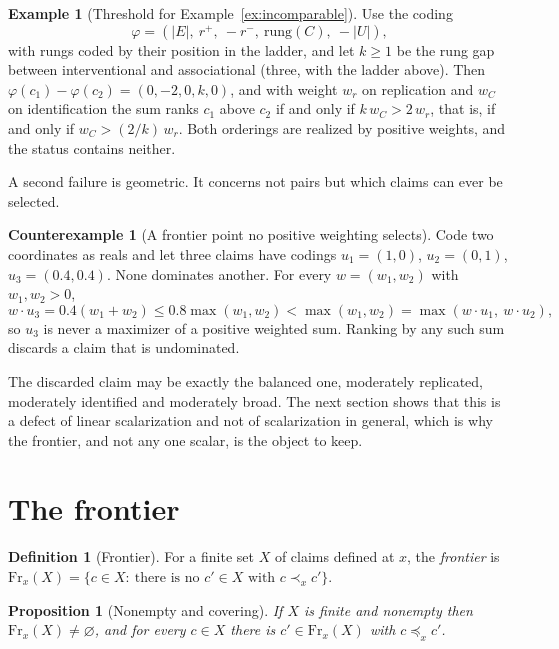 \documentclass[11pt]{article}
\theoremstyle{plain}
\newtheorem{proposition}[theorem]{Proposition}
\theoremstyle{definition}
\newtheorem{definition}[theorem]{Definition}
\newtheorem{example}[theorem]{Example}
\newtheorem{counterexample}[theorem]{Counterexample}
\theoremstyle{remark}
\newcommand{\Fr}{\mathrm{Fr}}
\begin{document}
\begin{example}[Threshold for Example~\ref{ex:incomparable}]\label{ex:threshold}
Use the coding
\[\varphi=(|E|,\ r^+,\ -r^-,\ \mathrm{rung}(C),\ -|U|),\]
with rungs coded by their position in the ladder, and let $k\ge1$ be the rung gap between \textsf{interventional} and \textsf{associational} (three, with the ladder above). Then $\varphi(c_1)-\varphi(c_2)=(0,-2,0,k,0)$, and with weight $w_r$ on replication and $w_C$ on identification the sum ranks $c_1$ above $c_2$ if and only if $k\,w_C>2\,w_r$, that is, if and only if $w_C>(2/k)\,w_r$. Both orderings are realized by positive weights, and the status contains neither.
\end{example}

A second failure is geometric. It concerns not pairs but which claims can ever be selected.

\begin{counterexample}[A frontier point no positive weighting selects]\label{cex:nonconvex}
Code two coordinates as reals and let three claims have codings $u_1=(1,0)$, $u_2=(0,1)$, $u_3=(0.4,0.4)$. None dominates another. For every $w=(w_1,w_2)$ with $w_1,w_2>0$,
\[
w\cdot u_3=0.4(w_1+w_2)\le 0.8\max(w_1,w_2)<\max(w_1,w_2)=\max(w\cdot u_1,\ w\cdot u_2),
\]
so $u_3$ is never a maximizer of a positive weighted sum. Ranking by any such sum discards a claim that is undominated.
\end{counterexample}

The discarded claim may be exactly the balanced one, moderately replicated, moderately identified and moderately broad. The next section shows that this is a defect of linear scalarization and not of scalarization in general, which is why the frontier, and not any one scalar, is the object to keep.

\section{The frontier}\label{sec:frontier}

\begin{definition}[Frontier]\label{def:frontier}
For a finite set $X$ of claims defined at $x$, the \emph{frontier} is $\Fr_x(X)=\{c\in X:\ \text{there is no }c'\in X\text{ with }c\prec_x c'\}$.
\end{definition}

\begin{proposition}[Nonempty and covering]\label{prop:pareto}
If $X$ is finite and nonempty then $\Fr_x(X)\ne\varnothing$, and for every $c\in X$ there is $c'\in\Fr_x(X)$ with $c\preceq_x c'$.
\end{proposition}
\end{document}
